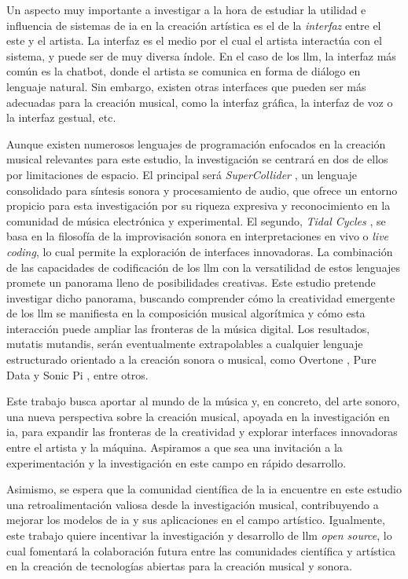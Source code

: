 Un aspecto muy importante a investigar a la hora de estudiar la utilidad e influencia de sistemas de \gls{ia} en la creación artística es el de la \emph{interfaz} entre el este y el artista. La interfaz es el medio por el cual el artista interactúa con el sistema, y puede ser de muy diversa índole. En el caso de los \gls{llm}, la interfaz más común es la {chatbot}, donde el artista se comunica en forma de diálogo en lenguaje natural. Sin embargo, existen otras interfaces que pueden ser más adecuadas para la creación musical, como la interfaz gráfica, la interfaz de voz o la interfaz gestual, etc.

Aunque existen numerosos lenguajes de programación enfocados en la creación musical relevantes para este estudio, la investigación se centrará en dos de ellos por limitaciones de espacio. El principal será \emph{SuperCollider} \citep{SupercolliderSupercollider2024}, un lenguaje consolidado para síntesis sonora y procesamiento de audio, que ofrece un entorno propicio para esta investigación por su riqueza expresiva y reconocimiento en la comunidad de música electrónica y experimental. El segundo, \emph{Tidal Cycles} \citep{LiveCodeTidal}, se basa en la filosofía de la improvisación sonora en interpretaciones en vivo o \emph{live coding}, lo cual permite la exploración de interfaces innovadoras. La combinación de las capacidades de codificación de los \gls{llm} con la versatilidad de estos lenguajes promete un panorama lleno de posibilidades creativas. Este estudio pretende investigar dicho panorama, buscando comprender cómo la creatividad emergente de los \gls{llm} se manifiesta en la composición musical algorítmica y cómo esta interacción puede ampliar las fronteras de la música digital. Los resultados, mutatis mutandis, serán eventualmente extrapolables a cualquier lenguaje estructurado orientado a la creación sonora o musical, como {Overtone} \citep{OvertoneCollaborativeProgrammable}, {Pure Data} \citep{PureDataPd} y {Sonic Pi} \citep{SonicPiLive}, entre otros.

Este trabajo busca aportar al mundo de la música y, en concreto, del arte sonoro, una nueva perspectiva sobre la creación musical, apoyada en la investigación en \gls{ia}, para expandir las fronteras de la creatividad y explorar interfaces innovadoras entre el artista y la máquina. Aspiramos a que sea una invitación a la experimentación y la investigación en este campo en rápido desarrollo.

Asimismo, se espera que la comunidad científica de la \gls{ia} encuentre en este estudio una retroalimentación valiosa desde la investigación musical, contribuyendo a mejorar los modelos de \gls{ia} y sus aplicaciones en el campo artístico. Igualmente, este trabajo quiere incentivar la investigación y desarrollo de \gls{llm} \emph{open source}, lo cual fomentará la colaboración futura entre las comunidades científica y artística en la creación de tecnologías abiertas para la creación musical y sonora.